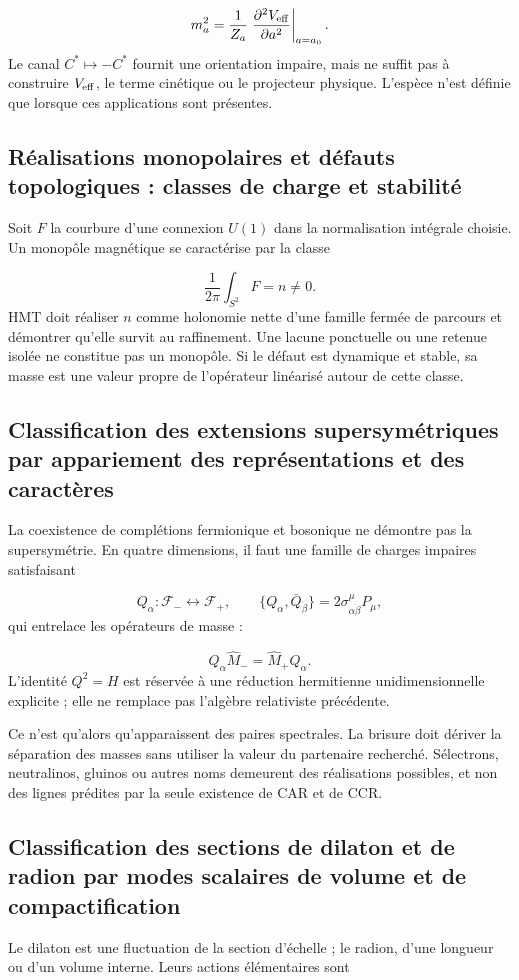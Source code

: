 \[
m_a^2=\frac1{Z_a}
\left.
\frac{\partial^2V_{\rm eff}}{\partial a^2}
\right|_{a=a_0}.
\]
Le canal \(C^*\mapsto-C^*\) fournit une orientation impaire, mais ne suffit pas à construire \(V_{\rm eff}\), le terme cinétique ou le projecteur physique. L'espèce n'est définie que lorsque ces applications sont présentes.

\subsection{Réalisations monopolaires et défauts topologiques : classes de charge et stabilité}
Soit \(F\) la courbure d'une connexion \(U(1)\) dans la normalisation intégrale choisie. Un monopôle magnétique se caractérise par la classe

\[
\frac1{2\pi}\int_{S^2}F=n\ne0.
\]
HMT doit réaliser \(n\) comme holonomie nette d'une famille fermée de parcours et démontrer qu'elle survit au raffinement. Une lacune ponctuelle ou une retenue isolée ne constitue pas un monopôle. Si le défaut est dynamique et stable, sa masse est une valeur propre de l'opérateur linéarisé autour de cette classe.

\subsection{Classification des extensions supersymétriques par appariement des représentations et des caractères}
La coexistence de complétions fermionique et bosonique ne démontre pas la supersymétrie. En quatre dimensions, il faut une famille de charges impaires satisfaisant

\[
Q_\alpha:\mathcal F_-\longleftrightarrow\mathcal F_+,
\qquad
\{Q_\alpha,\bar Q_{\dot\beta}\}
=2\sigma^\mu_{\alpha\dot\beta}P_\mu,
\]
qui entrelace les opérateurs de masse :

\[
Q_\alpha\widehat M_-=\widehat M_+Q_\alpha.
\]
L'identité \(Q^2=H\) est réservée à une réduction hermitienne unidimensionnelle explicite ; elle ne remplace pas l'algèbre relativiste précédente.

Ce n'est qu'alors qu'apparaissent des paires spectrales. La brisure doit dériver la séparation des masses sans utiliser la valeur du partenaire recherché. Sélectrons, neutralinos, gluinos ou autres noms demeurent des réalisations possibles, et non des lignes prédites par la seule existence de CAR et de CCR.

\subsection{Classification des sections de dilaton et de radion par modes scalaires de volume et de compactification}
Le dilaton est une fluctuation de la section d'échelle ; le radion, d'une longueur ou d'un volume interne. Leurs actions élémentaires sont

